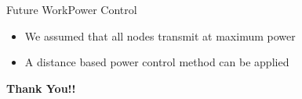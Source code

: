 \documentclass{beamer}
\begin{document}
\begin{frame}{Future Work}{Power Control}
\vspace{1cm}
\begin{itemize}  
  \item
   We assumed that all nodes transmit at maximum power
   \vspace{1cm}
   \pause
  \item A distance based power control method can be applied 
  \end{itemize}
\end{frame}


\begin{frame}{}
\centering
\textbf{Thank You!!}


\end{frame}
\end{document}
